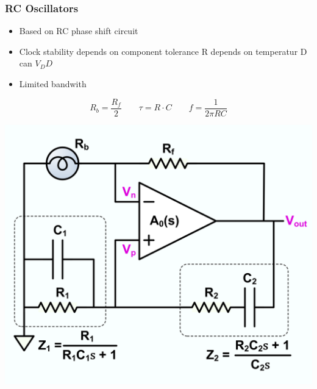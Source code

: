 \subsubsection{RC Oscillators}
\begin{minipage}{0.5\linewidth}
\begin{itemize}
    \item Based on RC phase shift circuit
    \item Clock stability depends on component tolerance
        \subitem R depends on temperatur
        \subitem D can $ V_DD $
    \item Limited bandwith   
\end{itemize}
\[ R_b = \dfrac{R_f}{2} \qquad \tau=R\cdot C \qquad f = \dfrac{1}{2 \pi RC}  \]
\end{minipage}
\begin{minipage}{0.5\linewidth}
    \hspace{1cm}\includegraphics[width=0.5\linewidth]{images/RCOscillator} 
\end{minipage}

